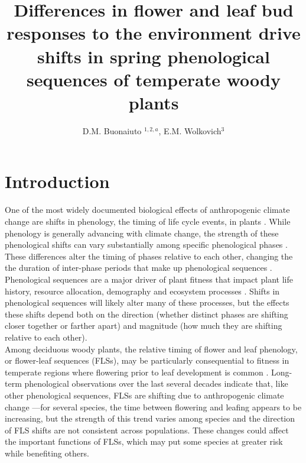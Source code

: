 \documentclass[11pt]{article}
\title{Differences in flower and leaf bud responses to the environment drive shifts in spring phenological sequences of temperate woody plants}\\
\date{}
\author{D.M. Buonaiuto $^{1,2,a}$, E.M. Wolkovich$^{3}$}
\begin{document}
\maketitle
\section*{Introduction}
\noindent One of the most widely documented biological effects of anthropogenic climate change are shifts in phenology, the timing of life cycle events, in plants \citep{Parmesan2003,Menzel2006,Cleland2007}. While phenology is generally advancing with climate change, the strength of these phenological shifts can vary substantially among specific phenological phases \citep{Augspurger:2020aa}. These differences alter the timing of phases relative to each other, changing the the duration of inter-phase periods that make up phenological sequences \citep{Ettinger2018}. Phenological sequences are a major driver of plant fitness that impact plant life history, resource allocation, demography and ecosystem processes \citep{Post:2008aa}. Shifts in phenological sequences will likely alter many of these processes, but the effects these shifts depend both on the direction (whether distinct phases are shifting closer together or farther apart) and magnitude (how much they are shifting relative to each other).\\ %

\noindent Among deciduous woody plants, the relative timing of flower and leaf phenology, or flower-leaf sequences (FLSs), may be particularly consequential to fitness in temperate regions where flowering prior to leaf development is common \citep{Rathcke_1985,Gougherty2018}. %
Long-term phenological observations over the last several decades indicate that, like other phenological sequences, FLSs are shifting due to anthropogenic climate change \citep{Buonaiuto2020}---for several species, the time between flowering and leafing appears to be increasing, but the strength of this trend varies among species and the direction of FLS shifts are not consistent across populations. These changes could affect the important functions of FLSs, which may put some species at greater risk while benefiting others.\\
\end{document}
